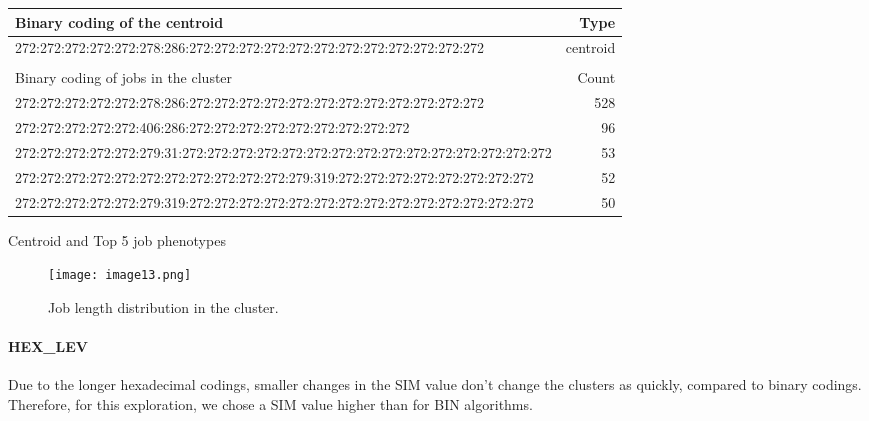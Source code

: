 \documentclass{jhps}
\begin{document}
\begin{minipage}{\textwidth}
\begingroup
  \begin{subtable}{\textwidth}
  \centering
  \begin{tiny}
    \begin{tabular}{l|r}
      \rowcolor{tblhead}
      Binary coding of the centroid                                                                         &  Type     \\
      \hline
      272:272:272:272:272:278:286:272:272:272:272:272:272:272:272:272:272:272:272            &  centroid \\
      \multicolumn{2}{l}{}                                                                   \\
      \hline
      \rowcolor{tblhead}
      Binary coding of jobs in the cluster                                                                          &  Count    \\
      272:272:272:272:272:278:286:272:272:272:272:272:272:272:272:272:272:272:272            &  528      \\
      272:272:272:272:272:406:286:272:272:272:272:272:272:272:272:272                        &  96       \\
      272:272:272:272:272:279:31:272:272:272:272:272:272:272:272:272:272:272:272:272:272:272 &  53       \\
      272:272:272:272:272:272:272:272:272:272:272:279:319:272:272:272:272:272:272:272:272    &  52       \\
      272:272:272:272:272:279:319:272:272:272:272:272:272:272:272:272:272:272:272:272:272    &  50       \\
    \end{tabular}
  \end{tiny}
  \caption{Centroid and Top 5 job phenotypes}
  \label{tab:bin_aggzeros:top_jobs}
  \end{subtable}
\endgroup

\medskip

\begingroup
  \begin{subfigure}{\textwidth}
  \centering
  \texttt{[image: image13.png]}
  \caption{Job length distribution in the cluster.}
  \label{fig:bin_aggzeros:length}
  \end{subfigure}
\endgroup

\label{fig:bin_aggzeros}
\end{minipage}


\paragraph{HEX\_LEV}
Due to the longer hexadecimal codings, smaller changes in the SIM value don't change the clusters as quickly,  compared to binary codings.
Therefore, for this exploration, we chose a SIM value higher than for BIN algorithms.
\end{document}
